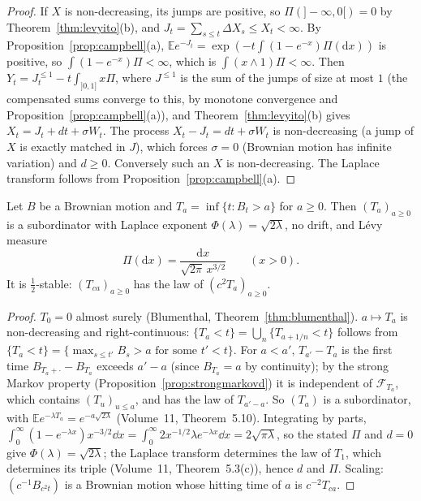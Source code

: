 \begin{proof}
If $X$ is non-decreasing, its jumps are positive, so $\Pi(]-\infty,0[)=0$ by Theorem~\ref{thm:levyito}(b), and $J_t=\sum_{s\le t}\Delta X_s\le X_t<\infty$. By Proposition~\ref{prop:campbell}(a),
$\mathbb Ee^{-J_t}=\exp(-t\int(1-e^{-x})\Pi(\mathrm dx))$ is positive, so $\int(1-e^{-x})\Pi<\infty$, which is $\int(x\wedge1)\Pi<\infty$. Then $Y_t=J^{\le1}_t-t\int_{]0,1]}x\Pi$, where $J^{\le1}$ is the sum of the jumps of size at most $1$
(the compensated sums converge to this, by monotone convergence and Proposition~\ref{prop:campbell}(a)), and Theorem~\ref{thm:levyito}(b) gives $X_t=J_t+dt+\sigma W_t$. The process $X_t-J_t=dt+\sigma W_t$ is non-decreasing (a jump of
$X$ is exactly matched in $J$), which forces $\sigma=0$ (Brownian motion has infinite variation) and $d\ge0$. Conversely such an $X$ is non-decreasing. The Laplace transform follows from Proposition~\ref{prop:campbell}(a).
\end{proof}

\begin{theorem}\label{thm:halfstable}
Let $B$ be a Brownian motion and $T_a=\inf\{t:B_t>a\}$ for $a\ge0$. Then $(T_a)_{a\ge0}$ is a subordinator with Laplace exponent $\Phi(\lambda)=\sqrt{2\lambda}$, no drift, and L\'evy measure
\[
\Pi(\mathrm dx)=\frac{\mathrm dx}{\sqrt{2\pi}\,x^{3/2}}\qquad(x>0).
\]
It is $\frac12$-stable: $(T_{ca})_{a\ge0}$ has the law of $(c^2T_a)_{a\ge0}$.
\end{theorem}

\begin{proof}
$T_0=0$ almost surely (Blumenthal, Theorem~\ref{thm:blumenthal}). $a\mapsto T_a$ is non-decreasing and right-continuous: $\{T_a<t\}=\bigcup_n\{T_{a+1/n}<t\}$ follows from $\{T_a<t\}=\{\max_{s\le t'}B_s>a\text{ for some }t'<t\}$.
For $a<a'$, $T_{a'}-T_a$ is the first time $B_{T_a+\cdot}-B_{T_a}$ exceeds $a'-a$ (since $B_{T_a}=a$ by continuity); by the strong Markov property (Proposition~\ref{prop:strongmarkovd}) it is independent of $\mathcal F_{T_a}$, which contains
$(T_u)_{u\le a}$, and has the law of $T_{a'-a}$. So $(T_a)$ is a subordinator, with $\mathbb Ee^{-\lambda T_a}=e^{-a\sqrt{2\lambda}}$ (Volume~11, Theorem~5.10). Integrating by parts,
$\int_0^\infty(1-e^{-\lambda x})x^{-3/2}\dd x=\int_0^\infty2x^{-1/2}\lambda e^{-\lambda x}\dd x=2\sqrt{\pi\lambda}$, so the stated $\Pi$ and $d=0$ give $\Phi(\lambda)=\sqrt{2\lambda}$; the Laplace transform determines the law of $T_1$, which determines its triple (Volume~11, Theorem~5.3(c)), hence $d$ and $\Pi$. Scaling: $(c^{-1}B_{c^2t})$ is a Brownian motion whose hitting time of $a$ is $c^{-2}T_{ca}$.
\end{proof}

